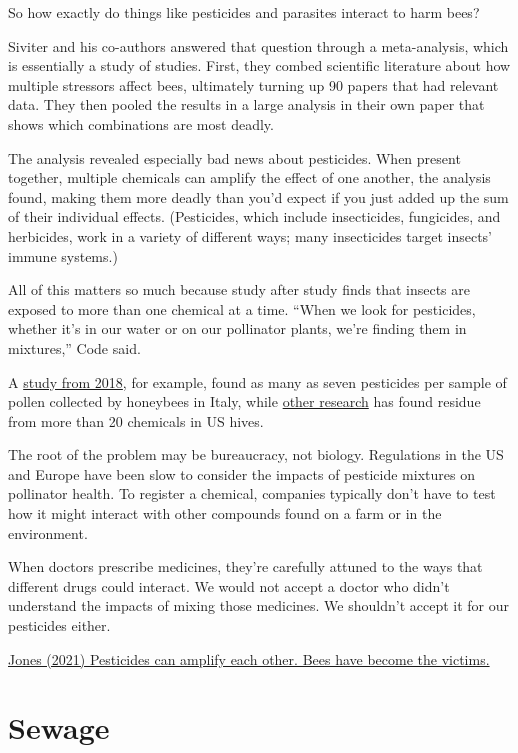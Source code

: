 \documentclass[
]{book}
\begin{document}
So how exactly do things like pesticides and parasites interact to harm bees?

Siviter and his co-authors answered that question through a meta-analysis, which is essentially a study of studies. First, they combed scientific literature about how multiple stressors affect bees, ultimately turning up 90 papers that had relevant data. They then pooled the results in a large analysis in their own paper that shows which combinations are most deadly.

The analysis revealed especially bad news about pesticides. When present together, multiple chemicals can amplify the effect of one another, the analysis found, making them more deadly than you'd expect if you just added up the sum of their individual effects. (Pesticides, which include insecticides, fungicides, and herbicides, work in a variety of different ways; many insecticides target insects' immune systems.)

All of this matters so much because study after study finds that insects are exposed to more than one chemical at a time. ``When we look for pesticides, whether it's in our water or on our pollinator plants, we're finding them in mixtures,'' Code said.

A \href{https://pubmed.ncbi.nlm.nih.gov/28968582/}{study from 2018}, for example, found as many as seven pesticides per sample of pollen collected by honeybees in Italy, while \href{https://www.sciencedirect.com/science/article/abs/pii/S0269749121001445\#}{other research} has found residue from more than 20 chemicals in US hives.

The root of the problem may be bureaucracy, not biology. Regulations in the US and Europe have been slow to consider the impacts of pesticide mixtures on pollinator health. To register a chemical, companies typically don't have to test how it might interact with other compounds found on a farm or in the environment.

When doctors prescribe medicines, they're carefully attuned to the ways that different drugs could interact. We would not accept a doctor who didn't understand the impacts of mixing those medicines. We shouldn't accept it for our pesticides either.

\href{https://www.vox.com/22612979/pesticide-mixtures-kill-bees-insects-pollinators}{Jones (2021) Pesticides can amplify each other. Bees have become the victims.}

\hypertarget{sewage}{%
\section{Sewage}\label{sewage}}
\end{document}

